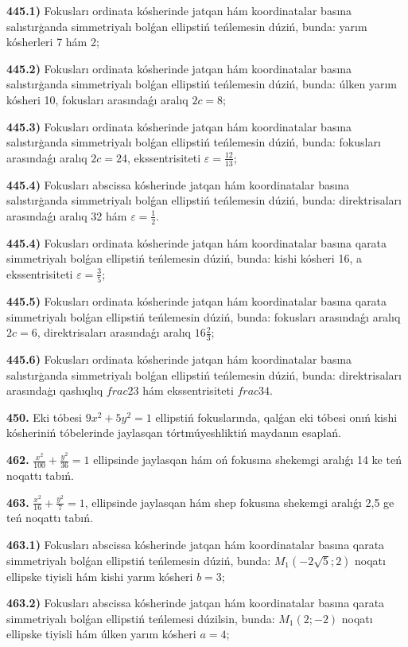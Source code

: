 \textbf{445.1)} Fokusları ordinata kósherinde jatqan hám koordinatalar basına salıstırģanda simmetriyalı bolǵan ellipstiń teńlemesin dúziń, bunda: yarım kósherleri 7 hám 2;

\textbf{445.2)} Fokusları ordinata kósherinde jatqan hám koordinatalar basına salıstırģanda simmetriyalı bolǵan ellipstiń teńlemesin dúziń, bunda: úlken yarım kósheri 10, fokusları arasındaǵı aralıq $2 c=8$;

\textbf{445.3)} Fokusları ordinata kósherinde jatqan hám koordinatalar basına salıstırģanda simmetriyalı bolǵan ellipstiń teńlemesin dúziń, bunda: fokusları arasındaǵı aralıq $2 c=24$, ekssentrisiteti $\varepsilon=\frac{12}{13}$;

\textbf{445.4)} Fokusları abscissa kósherinde jatqan hám koordinatalar basına salıstırģanda simmetriyalı bolǵan ellipstiń teńlemesin dúziń, bunda: direktrisaları arasındaǵı aralıq 32 hám $\varepsilon=\frac{1}{2}$.

\textbf{445.4)} Fokusları ordinata kósherinde jatqan hám koordinatalar basına qarata simmetriyalı bolǵan ellipstiń teńlemesin dúziń, bunda: kishi kósheri 16, a ekssentrisiteti $\varepsilon=\frac{3}{5}$;

\textbf{445.5)} Fokusları ordinata kósherinde jatqan hám koordinatalar basına qarata simmetriyalı bolǵan ellipstiń teńlemesin dúziń, bunda: fokusları arasındaǵı aralıq $2 c=6$, direktrisaları arasındaǵı aralıq $16 \frac{2}{3}$;

\textbf{445.6)} Fokusları ordinata kósherinde jatqan hám koordinatalar basına salıstırģanda simmetriyalı bolǵan ellipstiń teńlemesin dúziń, bunda: direktrisaları arasındaģı qashıqlıq $frac{2}{3}$ hám ekssentrisiteti $frac{3}{4}$.

\textbf{450.} Eki tóbesi $9 x^2+5 y^2=1$ ellipstiń fokuslarında, qalǵan eki tóbesi onıń kishi kósheriniń tóbelerinde jaylasqan tórtmúyeshliktiń maydanın esaplań.

\textbf{462.} $\frac{x^2}{100}+\frac{y^2}{36}=1$ ellipsinde jaylasqan hám oń fokusına shekemgi aralıǵı 14 ke teń noqattı tabıń.

\textbf{463.} $\frac{x^2}{16}+\frac{y^2}{7}=1$, ellipsinde jaylasqan hám shep fokusına shekemgi aralıǵı 2,5 ge teń noqattı tabıń.

\textbf{463.1)} Fokusları abscissa kósherinde jatqan hám koordinatalar basına qarata simmetriyalı bolǵan ellipstiń teńlemesin dúziń, bunda: $M_1 (-2 \sqrt{5}; 2) $ noqatı ellipske tiyisli hám kishi yarım kósheri $b=3$;

\textbf{463.2)} Fokusları abscissa kósherinde jatqan hám koordinatalar basına qarata simmetriyalı bolǵan ellipstiń teńlemesi dúzilsin, bunda: $M_1 (2;-2) $ noqatı ellipske tiyisli hám úlken yarım kósheri $a=4$;

